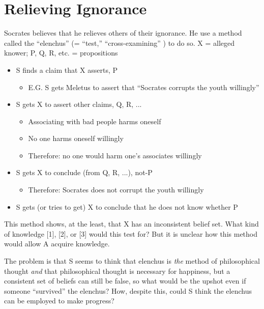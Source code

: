 \documentclass[10 pt]{article}
\begin{document}
\section*{Relieving Ignorance}
Socrates believes that he relieves others of their ignorance. He use a method called the ``elenchus'' (= ``test,'' ``cross-examining'' ) to do so.
\noindent X = alleged knower; P, Q, R, etc. = propositions
\begin{itemize}
\item{S finds a claim that X asserts, P}\begin{itemize}\item{E.G. S gets Meletus to assert that ``Socrates corrupts the youth willingly''}\end{itemize}
\item{S gets X to assert other claims, Q, R, ...}
\begin{itemize}\item{Associating with bad people harms oneself}\item{No one harms oneself willingly}\item{Therefore: no one would harm one's associates willingly}\end{itemize}

\item{S gets X to conclude (from Q, R, ...), not-P}\begin{itemize}\item{Therefore: Socrates does not corrupt the youth willingly}\end{itemize}

\item{S gets (or tries to get) X to conclude that he does not know whether P}
\end{itemize}
This method shows, at the least, that X has an inconsistent belief set. What kind of knowledge [1], [2], or [3] would this test for? But it is unclear how this method would allow A acquire knowledge.

The problem is that S seems to think that elenchus is \emph{the} method of philosophical thought \emph{and} that philosophical thought is necessary for happiness, but a consistent set of beliefs can still be false, so what would be the upshot even if someone ``survived'' the elenchus? How, despite this, could S think the elenchus can be employed to make progress?
\end{document}
